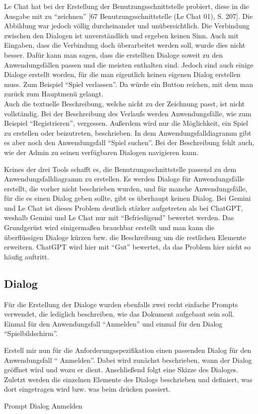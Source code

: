 Le Chat hat bei der Erstellung der Benutzungsschnittstelle probiert, diese in die Ausgabe mit zu ``zeichnen'' [67 Benutzungsschnittstelle (Le Chat 01), S. 207]. Die Abbildung war jedoch 
völlig durcheinander und unübersichtlich. Die Verbindung zwischen den Dialogen ist unverständlich und ergeben keinen Sinn. Auch mit 
Eingaben, dass die Verbindung doch überarbeitet werden soll, wurde dies nicht besser. Dafür kann man sagen, dass die erstellten Dialoge 
soweit zu den Anwendungsfällen passen und die meisten enthalten sind. Jedoch sind auch einige Dialoge erstellt worden, für die man 
eigentlich keinen eigenen Dialog erstellen muss. Zum Beispiel ``Spiel verlassen''. Da würde ein Button reichen, mit dem man zurück zum 
Hauptmenü gelangt.\\
Auch die textuelle Beschreibung, welche nicht zu der Zeichnung passt, ist nicht vollständig. Bei der Beschreibung des Verlaufs werden 
Anwendungsfälle, wie zum Beispiel ``Registrieren'', vergessen. Außerdem wird nur die Möglichkeit, ein Spiel zu erstellen oder beizutreten, 
beschrieben. In dem Anwendungsfalldiagramm gibt es aber noch den Anwendungsfall ``Spiel suchen''. Bei der Beschreibung fehlt auch, wie der 
Admin zu seinen verfügbaren Dialogen navigieren kann.

Keines der drei Tools schafft es, die Benutzungsschnittstelle passend zu dem Anwendungsfalldiagramm zu erstellen. Es werden Dialoge für 
Anwendungsfälle erstellt, die vorher nicht beschrieben wurden, und für manche Anwendungsfälle, für die es einen Dialog geben sollte, gibt 
es überhaupt keinen Dialog. Bei Gemini und Le Chat ist dieses Problem deutlich stärker aufgetreten als bei ChatGPT, weshalb Gemini und 
Le Chat nur mit ``Befriedigend'' bewertet werden. Das Grundgerüst wird einigermaßen brauchbar erstellt und man kann die überflüssigen Dialoge 
kürzen bzw. die Beschreibung um die restlichen Elemente erweitern. ChatGPT wird hier mit ``Gut'' bewertet, da das Problem hier nicht so 
häufig auftritt.

\subsection*{Dialog}

Für die Erstellung der Dialoge wurden ebenfalls zwei recht einfache Prompts verwendet, die lediglich beschreiben, wie das Dokument aufgebaut 
sein soll. Einmal für den Anwendungsfall ``Anmelden'' und einmal für den Dialog ``Spielbildschirm''.

\begin{prompt}[H]
    \begin{tcolorbox}[colback=gray!20, colframe=gray!20, boxrule=0pt, sharp corners] 
        Erstell mir nun für die Anforderungsspezifikation einen passenden Dialog für den Anwendungsfall ``
    Anmelden''. Dabei wird zunächst 
        beschrieben, wann der Dialog geöffnet wird und wozu er dient. Anschließend folgt eine Skizze des Dialoges. Zuletzt werden die 
        einzelnen Elemente des Dialogs beschrieben und definiert, was dort eingetragen wird bzw. was beim drücken passiert.
        \vfill
    \end{tcolorbox}
    \caption{Prompt Dialog Anmelden}
    \label{Prompt Dialog Anmelden}
\end{prompt}

